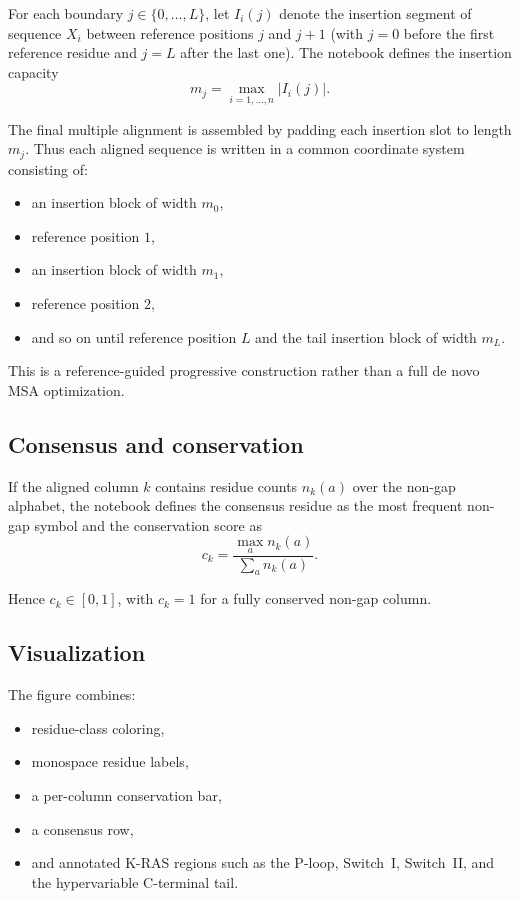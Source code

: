 \documentclass[11pt,a4paper]{article}
\begin{document}
For each boundary $j\in\{0,\dots,L\}$, let $I_i(j)$ denote the insertion segment of sequence $X_i$ between reference positions $j$ and $j+1$ (with $j=0$ before the first reference residue and $j=L$ after the last one). The notebook defines the insertion capacity
\[
m_j=\max_{i=1,\dots,n}|I_i(j)|.
\]

The final multiple alignment is assembled by padding each insertion slot to length $m_j$. Thus each aligned sequence is written in a common coordinate system consisting of:

\begin{itemize}[leftmargin=*]
\item an insertion block of width $m_0$,
\item reference position $1$,
\item an insertion block of width $m_1$,
\item reference position $2$,
\item and so on until reference position $L$ and the tail insertion block of width $m_L$.
\end{itemize}

This is a reference-guided progressive construction rather than a full de novo MSA optimization.

\subsection{Consensus and conservation}

If the aligned column $k$ contains residue counts $n_k(a)$ over the non-gap alphabet, the notebook defines the consensus residue as the most frequent non-gap symbol and the conservation score as
\[
c_k=\frac{\max_a n_k(a)}{\sum_a n_k(a)}.
\]

Hence $c_k\in[0,1]$, with $c_k=1$ for a fully conserved non-gap column.

\subsection{Visualization}

The figure combines:

\begin{itemize}[leftmargin=*]
\item residue-class coloring,
\item monospace residue labels,
\item a per-column conservation bar,
\item a consensus row,
\item and annotated K-RAS regions such as the P-loop, Switch~I, Switch~II, and the hypervariable C-terminal tail.
\end{itemize}
\end{document}
